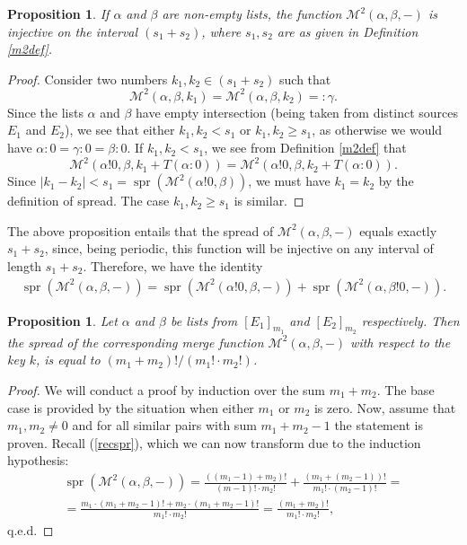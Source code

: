 \documentclass[a4paper, 10pt]{article}
\theoremstyle{plain}
\newtheorem{proposition}[theorem]{Proposition}
\theoremstyle{definition}
\newcommand{\wo}{\mathbin{!}}
\newcommand{\spr}[1]{\operatorname{spr}(#1)}
\newcommand{\m}{\mathcal{M}}
\begin{document}
\begin{proposition}
  \label{m2inj}
  If $\alpha$ and $\beta$ are non-empty lists, the function $\m^2(\alpha, \beta, -)$ is injective on the interval $(s_1 + s_2)$, where $s_1, s_2$ are as given in Definition \ref{m2def}.
\end{proposition}
\begin{proof}
  Consider two numbers $k_1, k_2 \in (s_1 + s_2)$ such that
  \[
    \m^2(\alpha, \beta, k_1) = \m^2(\alpha, \beta, k_2) =: \gamma.
  \]
  Since the lists $\alpha$ and $\beta$ have empty intersection (being taken from distinct sources $E_1$ and $E_2$), we see that either $k_1, k_2 < s_1$ or $k_1, k_2 \ge s_1$, as otherwise we would have $\alpha : 0 = \gamma : 0 = \beta : 0$. If $k_1, k_2 < s_1$, we see from Definition \ref{m2def} that
  \[
    \m^2 (\alpha \wo 0, \beta, k_1 + T(\alpha : 0)) = \m^2 (\alpha \wo 0, \beta, k_2 + T(\alpha : 0)).
  \]
  Since $|k_1 - k_2| < s_1 = \spr{\m^2(\alpha \wo 0, \beta)}$, we must have $k_1 = k_2$ by the definition of spread. The case $k_1, k_2 \geq s_1$ is similar.
\end{proof}

The above proposition entails that the spread of $\m^2(\alpha, \beta, -)$ equals exactly $s_1 + s_2$, since, being periodic, this function will be injective on any interval of length $s_1 + s_2$. Therefore, we have the identity
\begin{align}
  \label{recspr}
  \spr{\m^2(\alpha, \beta, -)} = \spr{\m^2 (\alpha \wo 0, \beta, -)} + \spr{\m^2(\alpha, \beta \wo 0, -)}.
\end{align}

\begin{proposition}
  \label{sprm2}
  Let $\alpha$ and $\beta$ be lists from $[E_1]_{m_1}$ and $[E_2]_{m_2}$ respectively. Then the spread of the corresponding merge function $\m^2(\alpha, \beta, -)$ with respect to the key $k$, is equal to $(m_1 + m_2)!/(m_1 ! \cdot m_2 !)$.
\end{proposition}
\begin{proof}
  We will conduct a proof by induction over the sum $m_1 + m_2$. The base case is provided by the situation when either $m_1$ or $m_2$ is zero. Now, assume that $m_1, m_2 \ne 0$ and for all similar pairs with sum $m_1 + m_2 - 1$ the statement is proven. Recall (\ref{recspr}), which we can now transform due to the induction hypothesis:
  \begin{align*}
    \spr{\m^2(\alpha, \beta, -)} = \frac{((m_1 - 1) + m_2)!}{(m-1)! \cdot m_2 !} + \frac{(m_1 + (m_2 - 1))!}{m_1 ! \cdot (m_2 - 1)!} =\\
    = \frac{m_1 \cdot (m_1 + m_2 - 1)! + m_2 \cdot (m_1 + m_2 - 1)!}{m_1 ! \cdot m_2 !} = \frac{(m_1 + m_2)!}{m_1! \cdot m_2!},
  \end{align*}
  q.e.d.
\end{proof}
\end{document}
